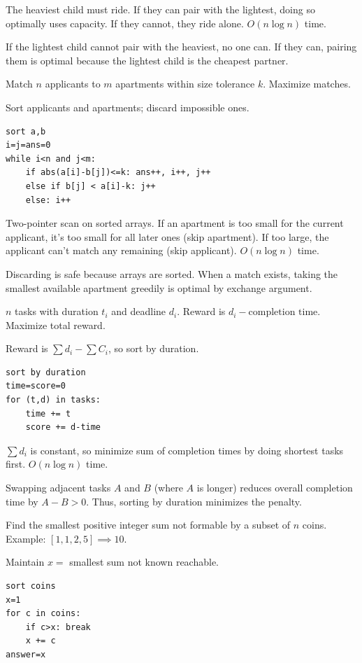 \Solution The heaviest child must ride. If they can pair with the lightest, doing so optimally uses capacity. If they cannot, they ride alone. $O(n \log n)$ time.

\Analysis If the lightest child cannot pair with the heaviest, no one can. If they can, pairing them is optimal because the lightest child is the cheapest partner.


\Problem Match $n$ applicants to $m$ apartments within size tolerance $k$. Maximize matches.

Sort applicants and apartments; discard impossible ones.
\begin{lstlisting}
sort a,b
i=j=ans=0
while i<n and j<m:
    if abs(a[i]-b[j])<=k: ans++, i++, j++
    else if b[j] < a[i]-k: j++
    else: i++
\end{lstlisting}

\Solution Two-pointer scan on sorted arrays. If an apartment is too small for the current applicant, it's too small for all later ones (skip apartment). If too large, the applicant can't match any remaining (skip applicant). $O(n \log n)$ time.

\Analysis Discarding is safe because arrays are sorted. When a match exists, taking the smallest available apartment greedily is optimal by exchange argument.


\Problem $n$ tasks with duration $t_i$ and deadline $d_i$. Reward is $d_i - \text{completion time}$. Maximize total reward.

Reward is $\sum d_i-\sum C_i$, so sort by duration.
\begin{lstlisting}
sort by duration
time=score=0
for (t,d) in tasks:
    time += t
    score += d-time
\end{lstlisting}

\Solution $\sum d_i$ is constant, so minimize sum of completion times by doing shortest tasks first. $O(n \log n)$ time.

\Analysis Swapping adjacent tasks $A$ and $B$ (where $A$ is longer) reduces overall completion time by $A - B > 0$. Thus, sorting by duration minimizes the penalty.


\Problem Find the smallest positive integer sum not formable by a subset of $n$ coins. Example: $[1,1,2,5] \implies 10$.

Maintain $x=$ smallest sum not known reachable.
\begin{lstlisting}
sort coins
x=1
for c in coins:
    if c>x: break
    x += c
answer=x
\end{lstlisting}

